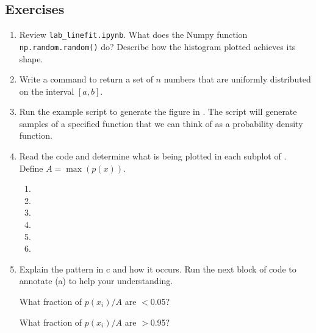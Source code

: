 \documentclass[11pt,titlepage,fleqn]{article}
\begin{document}


\pagebreak
\subsection*{Exercises}

\begin{enumerate}
\item Review \verb+lab_linefit.ipynb+. What does the Numpy function \verb+np.random.random()+ do? Describe how the histogram plotted achieves its shape.

\vertgap

\item Write a command to return a set of $n$ numbers that are uniformly distributed on the interval $[a,b]$.

\vertgap



\item Run the example script to generate the figure in . The script will generate samples of a specified function that we can think of as a probability density function.

\item Read the code and determine what is being plotted in each subplot of . \\
Define $A = \max(p(x))$.
%
\begin{spacing}{2.0}
\begin{enumerate}
\item 
\item 
\item 
\item 
\item 
\item 
\end{enumerate}
\end{spacing}

\item Explain the pattern in c and how it occurs. Run the next block of code to annotate (a) to help your understanding.

What fraction of $p(x_i)/A$ are $<$0.05?

What fraction of $p(x_i)/A$ are $>$0.95?


\end{enumerate}
\end{document}

